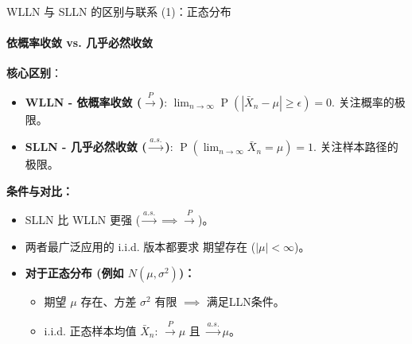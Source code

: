 \documentclass[UTF8]{beamer}
\DeclareMathOperator{\Prob}{\operatorname{P}}
\begin{document}
\begin{frame}{WLLN 与 SLLN 的区别与联系 (1)：正态分布}
    \framesubtitle{依概率收敛 vs. 几乎必然收敛}
    \textbf{核心区别}：
    \begin{itemize}
        \item \textbf{WLLN - \alert{依概率收敛} ($\xrightarrow{P}$)}: $\lim_{n \to \infty} \Prob(|\bar{X}_n - \mu| \geq \epsilon) = 0$. 关注\alert{概率}的极限。
        \item \textbf{SLLN - \alert{几乎必然收敛} ($\xrightarrow{a.s.}$)}: $\Prob(\lim_{n \to \infty} \bar{X}_n = \mu) = 1$. 关注\alert{样本路径}的极限。
    \end{itemize}
    \pause
    \textbf{条件与对比：}
    \begin{itemize}
        \item SLLN 比 WLLN \alert{更强} ($\xrightarrow{a.s.} \implies \xrightarrow{P}$)。
        \item 两者最广泛应用的 i.i.d. 版本都要求 \alert{期望存在} ($|\mu| < \infty$)。
        \item \textbf{对于正态分布 (例如 $N(\mu, \sigma^2)$)：}
            \begin{itemize}
                \item 期望 $\mu$ 存在、方差 $\sigma^2$ 有限 $\implies$ 满足LLN条件。
                \item i.i.d. 正态样本均值 $\bar{X}_n$: $\xrightarrow{P} \mu$ 且 $\xrightarrow{a.s.} \mu$。
            \end{itemize}
    \end{itemize}
\end{frame}
\end{document}
